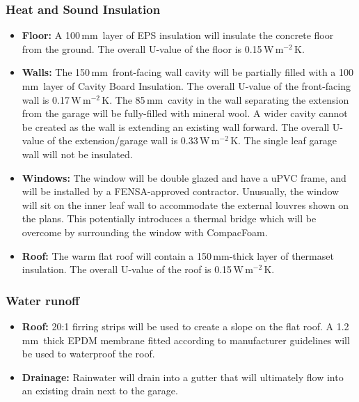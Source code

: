 \documentclass{extension}
\newcommand{\mm}{\,$\mathrm{mm}$}
\newcommand{\uunit}{\,$\mathrm{W\,m^{-2}\,K}$}
\begin{document}
\begin{itemize}
\end{itemize}

\subsubsection{Heat and Sound Insulation}
\begin{itemize}
  \item {\bf Floor:} A 100\mm\ layer of EPS\cite{efins} insulation will insulate the concrete floor from the ground. The overall U-value of the floor is 0.15\uunit .
  \item {\bf Walls:} The 150\mm\ front-facing wall cavity will be partially filled with a 100\mm\ layer of Cavity Board Insulation.\cite{ew1ins} The overall U-value of the front-facing wall is 0.17\uunit . The 85\mm\ cavity in the wall separating the extension from the garage will be fully-filled with mineral wool.\cite{ew2ins} A wider cavity cannot be created as the wall is extending an existing wall forward. The overall U-value of the extension/garage wall is 0.33\uunit. The single leaf garage wall will not be insulated.
  \item {\bf Windows:} The window will be double glazed and have a uPVC frame, and will be installed by a FENSA-approved contractor. Unusually, the window will sit on the inner leaf wall to accommodate the external louvres shown on the plans. This potentially introduces a thermal bridge which will be overcome by surrounding the window with CompacFoam.\cite{cfoam}
  \item {\bf Roof:} The warm flat roof will contain a 150\mm -thick layer of thermaset insulation.\cite{erins} The overall U-value of the roof is 0.15\uunit .
\end{itemize}
\subsubsection{Water runoff}
\begin{itemize}
  \item {\bf Roof:} 20:1 firring strips will be used to create a slope on the flat roof. A 1.2\mm\ thick EPDM membrane\cite{prmem} fitted according to manufacturer guidelines will be used to waterproof the roof.
  \item {\bf Drainage:} Rainwater will drain into a gutter that will ultimately flow into an existing drain next to the garage.
\end{itemize}
\end{document}
